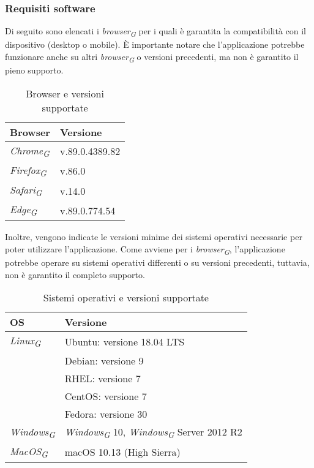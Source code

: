 \subsubsection{Requisiti software}
Di seguito sono elencati i \textit{browser}\textsubscript{\textit{G}} per i quali è garantita la compatibilità con il dispositivo (desktop o mobile). È importante notare che l'applicazione potrebbe funzionare anche su altri \textit{browser}\textsubscript{\textit{G}} o versioni precedenti, ma non è garantito il pieno supporto.  
\begin{table}[H]
    \centering
    \begin{tabular}{ll}
        \toprule
        \textbf{Browser} & \textbf{Versione} \\
        \midrule
        \textit{Chrome}\textsubscript{\textit{G}} & v.89.0.4389.82\\
        \textit{Firefox}\textsubscript{\textit{G}} & v.86.0 \\
        \textit{Safari}\textsubscript{\textit{G}} & v.14.0 \\
        \textit{Edge}\textsubscript{\textit{G}} & v.89.0.774.54 \\
        \bottomrule
    \end{tabular}
    \caption{Browser e versioni supportate}
\end{table}

Inoltre, vengono indicate le versioni minime dei sistemi operativi necessarie per poter utilizzare l'applicazione. Come avviene per i \textit{browser}\textsubscript{\textit{G}}, l'applicazione potrebbe operare su sistemi operativi differenti o su versioni precedenti, tuttavia, non è garantito il completo supporto.\\
\begin{table}[H]
    \centering
    \begin{tabular}{ll}
        \toprule
        \textbf{OS} & \textbf{Versione} \\
        \midrule
        \textit{Linux}\textsubscript{\textit{G}} & Ubuntu: versione 18.04 LTS\\&Debian: versione 9\\& RHEL: versione 7\\& CentOS: versione 7\\& Fedora: versione 30 \\
        \textit{Windows}\textsubscript{\textit{G}} & \textit{Windows}\textsubscript{\textit{G}} 10, \textit{Windows}\textsubscript{\textit{G}} Server 2012 R2 \\
        \textit{MacOS}\textsubscript{\textit{G}} & macOS 10.13 (High Sierra) \\
        \bottomrule
    \end{tabular}
    \caption{Sistemi operativi e versioni supportate}
\end{table} 
